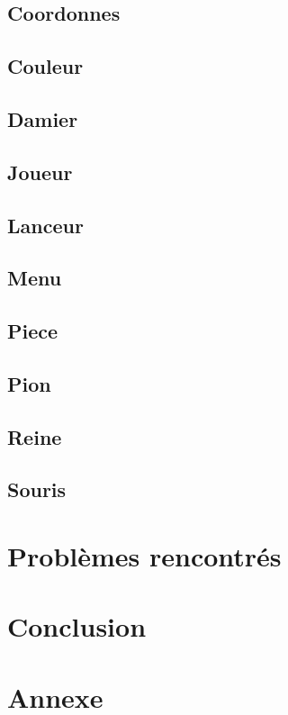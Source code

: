\documentclass[12,french]{report}
\begin{document}
\section{Coordonnes}

\section{Couleur}

\section{Damier}

\section{Joueur}

\section{Lanceur}

\section{Menu}

\section{Piece}

\section{Pion}

\section{Reine}

\section{Souris}



\chapter{Problèmes rencontrés}

\chapter*{Conclusion}

\chapter*{Annexe}
\end{document}
